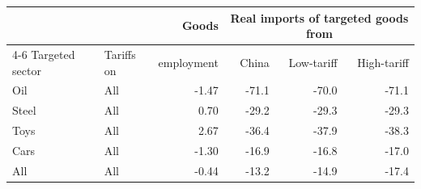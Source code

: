 \begin{tabular}{llrrrr}
\toprule
 & & Goods & \multicolumn{3}{c}{Real imports of targeted goods from} \\
\cmidrule(lr){4-6}
Targeted sector & Tariffs on & employment & China & Low-tariff & High-tariff \\
\midrule
Oil & All & -1.47 & -71.1 & -70.0 & -71.1 \\
\midrule
Steel & All & 0.70 & -29.2 & -29.3 & -29.3 \\
\midrule
Toys & All & 2.67 & -36.4 & -37.9 & -38.3 \\
\midrule
Cars & All & -1.30 & -16.9 & -16.8 & -17.0 \\
\midrule
All & All & -0.44 & -13.2 & -14.9 & -17.4 \\
\bottomrule
\end{tabular}
